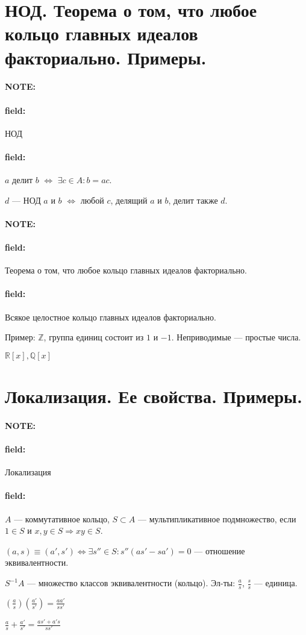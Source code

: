 \documentclass[12pt]{article}
\newenvironment{note}{\paragraph{NOTE:}}{}
\newenvironment{field}{\paragraph{field:}}{}
\begin{document}
\section{НОД. Теорема о том, что любое кольцо главных идеалов факториально.
Примеры.}

\begin{note}
  \begin{field}
    НОД
  \end{field}
  \begin{field}
    $a$ делит $b$
    $\Leftrightarrow$
    $\exists c \in A: b = ac$.

    $d$ --- НОД $a$ и $b$
    $\Leftrightarrow$
    любой $c$, делящий $a$ и $b$, делит также $d$.
  \end{field}
\end{note}

\begin{note}
  \begin{field}
    Теорема о том, что любое кольцо главных идеалов факториально.
  \end{field}
  \begin{field}
    Всякое целостное кольцо главных идеалов факториально.

    Пример: $\mathbb{Z}$, группа единиц состоит из $1$ и $-1$.
    Неприводимые --- простые числа.

    $\mathbb{R}[x], \mathbb{Q}[x]$
  \end{field}
\end{note}

\section{Локализация. Ее свойства. Примеры.}

\begin{note}
  \begin{field}
    Локализация
  \end{field}
  \begin{field}
    $A$ --- коммутативное кольцо,
    $S \subset A$ --- мультипликативное подмножество,
    если $1 \in S$ и $x, y \in S \Rightarrow xy \in S$.

    $(a, s) \equiv (a', s') \Leftrightarrow \exists s'' \in S: s''(as' - sa') = 0$ --- отношение эквивалентности.

    $S^{-1}A$ --- множество классов эквивалентности (кольцо). Эл-ты: $\frac{a}{s}$, $\frac{s}{s}$ --- единица.

    $(\frac{a}{s})(\frac{a'}{s'}) = \frac{aa'}{ss'}$

    $\frac{a}{s} + \frac{a'}{s'} = \frac{as' + a's}{ss'}$
  \end{field}
\end{note}
\end{document}
